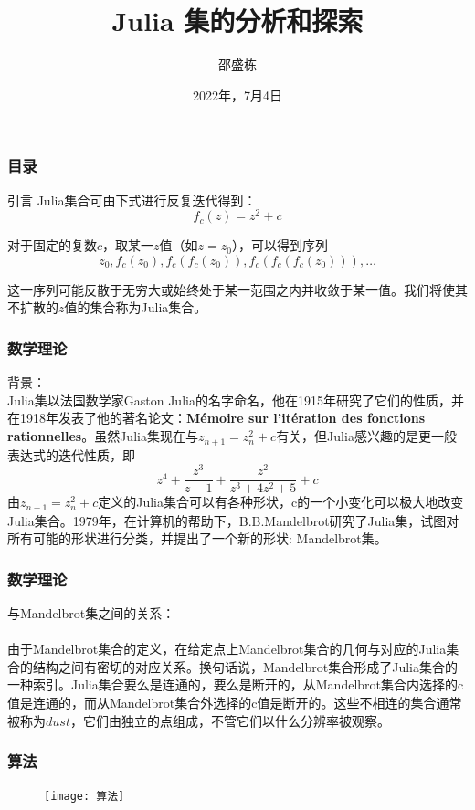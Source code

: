 \documentclass[UTF8]{ctexbeamer}
\title[Analysis and exploration of Julia sets]
{Julia 集的分析和探索}
\author[SHAO Shengdong]
{邵盛栋}
\institute[3200103951]
{
	信息与计算科学
	\and
	3200103951
}
\date[July 4]
{2022年，7月4日}
\begin{document}
	\maketitle
	\begin{frame}
		\frametitle{目录}
		\tableofcontents {}
		\tableofcontents {}
		\tableofcontents {}
		\tableofcontents {}
		\tableofcontents {}
	\end{frame}
	\begin{frame}{引言}
		Julia集合可由下式进行反复迭代得到：
		\[f_{c}(z)=z^{2}+c\]
		
		对于固定的复数$ c $，取某一$ z $值（如$ z=z_{0} $），可以得到序列
		\[z_{0},f_{c}(z_{0}),f_{c}(f_{c}(z_{0})),f_{c}(f_{c}(f_{c}(z_{0}))),\dots\]
		
		这一序列可能反散于无穷大或始终处于某一范围之内并收敛于某一值。我们将使其不扩散的$ z $值的集合称为Julia集合。
	\end{frame}
	\begin{frame}
		\frametitle{数学理论}
		{\Large 背景：}\\
		Julia集以法国数学家Gaston Julia的名字命名，他在1915年研究了它们的性质，并在1918年发表了他的著名论文：\textbf{Mémoire sur l'itération des fonctions rationnelles}。虽然Julia集现在与$ z_{n+1}=z_{n}^{2}+c $有关，但Julia感兴趣的是更一般表达式的迭代性质，即
		\[z^{4}+\dfrac{z^{3}}{z-1}+\dfrac{z^{2}}{z^{3}+4z^{2}+5}+c\]
		由$ z_{n+1}=z_{n}^{2}+c $定义的Julia集合可以有各种形状，c的一个小变化可以极大地改变Julia集合。1979年，在计算机的帮助下，B.B.Mandelbrot研究了Julia集，试图对所有可能的形状进行分类，并提出了一个新的形状: Mandelbrot集\cite{douady1986julia}。
	\end{frame}
	\begin{frame}
		\frametitle{数学理论}
		{\Large 与Mandelbrot集之间的关系：}
		\\ \hspace*{\fill} \\
		由于Mandelbrot集合的定义，在给定点上Mandelbrot集合的几何与对应的Julia集合的结构之间有密切的对应关系。换句话说，Mandelbrot集合形成了Julia集合的一种索引。\cite{lei1990similarity}Julia集合要么是连通的，要么是断开的，从Mandelbrot集合内选择的c值是连通的，而从Mandelbrot集合外选择的c值是断开的。这些不相连的集合通常被称为$ dust $，它们由独立的点组成，不管它们以什么分辨率被观察\cite{Juliaset}。
	\end{frame}
	\begin{frame}
		\frametitle{算法}
		\begin{figure}
			\centering
			\texttt{[image: 算法]}
		\end{figure}
	\end{frame}
\end{document}
